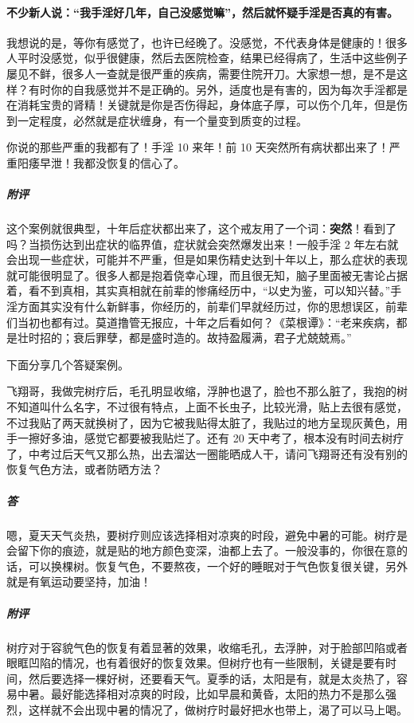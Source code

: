 \paragraph{不少新人说：“我手淫好几年，自己没感觉嘛”，然后就怀疑手淫是否真的有害。}

我想说的是，等你有感觉了，也许已经晚了。没感觉，不代表身体是健康的！很多人平时没感觉，似乎很健康，然后去医院检查，结果已经得病了，生活中这些例子屡见不鲜，很多人一查就是很严重的疾病，需要住院开刀。大家想一想，是不是这样？有时你的自我感觉并不是正确的。另外，适度也是有害的，因为每次手淫都是在消耗宝贵的肾精！关键就是你是否伤得起，身体底子厚，可以伤个几年，但是伤到一定程度，必然就是症状缠身，有一个量变到质变的过程。

\begin{case}
    你说的那些严重的我都有了！手淫 10 来年！前 10 天突然所有病状都出来了！严重阳痿早泄！我都没恢复的信心了。
    \subparagraph{附评} 这个案例就很典型，十年后症状都出来了，这个戒友用了一个词：\textbf{突然}！看到了吗？当损伤达到出症状的临界值，症状就会突然爆发出来！一般手淫 2 年左右就会出现一些症状，可能并不严重，但是如果伤精史达到十年以上，那么症状的表现就可能很明显了。很多人都是抱着侥幸心理，而且很无知，脑子里面被无害论占据着，看不到真相，其实真相就在前辈的惨痛经历中，“以史为鉴，可以知兴替。”手淫方面其实没有什么新鲜事，你经历的，前辈们早就经历过，你的思想误区，前辈们当初也都有过。莫道撸管无报应，十年之后看如何？《菜根谭》：“老来疾病，都是壮时招的；衰后罪孽，都是盛时造的。故持盈履满，君子尤兢兢焉。”
\end{case}

下面分享几个答疑案例。

\begin{case}
    飞翔哥，我做完树疗后，毛孔明显收缩，浮肿也退了，脸也不那么脏了，我抱的树不知道叫什么名字，不过很有特点，上面不长虫子，比较光滑，贴上去很有感觉，不过我贴了两天就换树了，因为它被我贴得太脏了，我贴过的地方呈现灰黄色，用手一擦好多油，感觉它都要被我贴烂了。还有 20 天中考了，根本没有时间去树疗了，中考过后天气又那么热，出去溜达一圈能晒成人干，请问飞翔哥还有没有别的恢复气色方法，或者防晒方法？
    \subparagraph{答} 嗯，夏天天气炎热，要树疗则应该选择相对凉爽的时段，避免中暑的可能。树疗是会留下你的痕迹，就是贴的地方颜色变深，油都上去了。一般没事的，你很在意的话，可以换棵树。恢复气色，不要熬夜，一个好的睡眠对于气色恢复很关键，另外就是有氧运动要坚持，加油！
    \subparagraph{附评} 树疗对于容貌气色的恢复有着显著的效果，收缩毛孔，去浮肿，对于脸部凹陷或者眼眶凹陷的情况，也有着很好的恢复效果。但树疗也有一些限制，关键是要有时间，然后要选择一棵好树，还要看天气。夏季的话，太阳是有，就是太炎热了，容易中暑。最好能选择相对凉爽的时段，比如早晨和黄昏，太阳的热力不是那么强烈，这样就不会出现中暑的情况了，做树疗时最好把水也带上，渴了可以马上喝。
\end{case}

